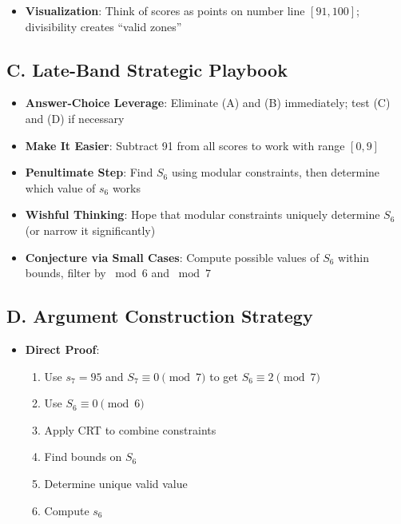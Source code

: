 \documentclass[11pt]{article}
\begin{document}
\begin{strategicbox}
\begin{itemize}[leftmargin=*]
    \item \textbf{Visualization}: Think of scores as points on number line $[91, 100]$; divisibility creates ``valid zones''
\end{itemize}

\subsection*{C. Late-Band Strategic Playbook}
\begin{itemize}[leftmargin=*]
    \item \textbf{Answer-Choice Leverage}: Eliminate (A) and (B) immediately; test (C) and (D) if necessary
    
    \item \textbf{Make It Easier}: Subtract 91 from all scores to work with range $[0, 9]$
    
    \item \textbf{Penultimate Step}: Find $S_6$ using modular constraints, then determine which value of $s_6$ works
    
    \item \textbf{Wishful Thinking}: Hope that modular constraints uniquely determine $S_6$ (or narrow it significantly)
    
    \item \textbf{Conjecture via Small Cases}: Compute possible values of $S_6$ within bounds, filter by $\bmod 6$ and $\bmod 7$
\end{itemize}

\subsection*{D. Argument Construction Strategy}
\begin{itemize}[leftmargin=*]
    \item \textbf{Direct Proof}: 
    \begin{enumerate}
        \item Use $s_7 = 95$ and $S_7 \equiv 0 \pmod{7}$ to get $S_6 \equiv 2 \pmod{7}$
        \item Use $S_6 \equiv 0 \pmod{6}$
        \item Apply CRT to combine constraints
        \item Find bounds on $S_6$
        \item Determine unique valid value
        \item Compute $s_6$
    \end{enumerate}
    

\end{itemize}
\end{strategicbox}
\end{document}
